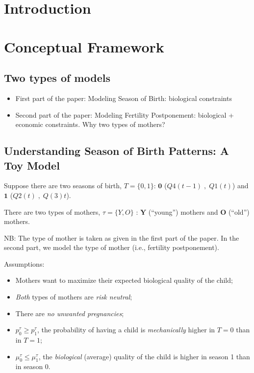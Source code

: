 \documentclass[a4paper, 11 pt]{article}
\theoremstyle{plain}
\begin{document}
\newpage
\begin{spacing}{1.2}

\section{Introduction}
\section{Conceptual Framework}
\subsection{Two types of models}
\begin{itemize}
  \item First part of the paper: Modeling Season of Birth: biological constraints
  \item Second part of the paper: Modeling Fertility Postponement: biological + economic constraints. Why two types of mothers?
\end{itemize}

\subsection{Understanding Season of Birth Patterns: A Toy Model}
Suppose there are two seasons of birth, $T=\{0,1\}$: $\mathbf{0}$ ($Q4(t-1)\;,\;Q1(t)$) and $\mathbf{1}$ ($Q2(t)\;,\;Q(3)t$).

There are two types of mothers, $\tau=\{Y,O\}$ : $\mathbf{Y}$ (``young'') mothers and  $\mathbf{O}$  (``old'') mothers.

NB: The type of mother is taken as given in the first part of the paper. In the second part, we model the type of mother (i.e., fertility postponement).

Assumptions:
\begin{itemize}
  \item Mothers want to maximize their expected biological quality of the child;
  \item \emph{Both} types of mothers are \emph{risk neutral};
  \item There are \emph{no unwanted pregnancies};
  \item $p_0^{\tau} \geq p_1^{\tau}$, the probability of having a child is \emph{mechanically} higher in $T=0$ than in $T=1$;
  \item $\mu_0^{\tau} \leq \mu_1^{\tau}$, the \emph{biological} (average) quality of the child is higher in season 1 than in season 0.
\end{itemize}


\end{spacing}
\end{document}
